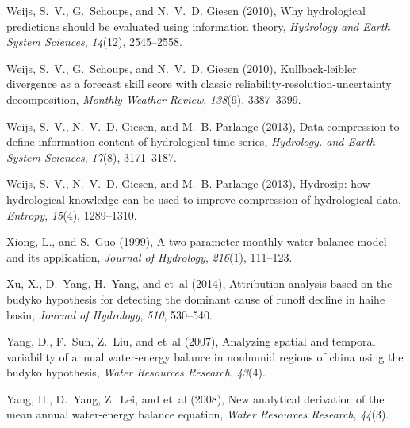 \documentclass[draft,wrr]{AGUTeX}
\begin{document}
\begin{article}
\begin{thebibliography}{59}
Weijs, S.~V., G.~Schoups, and N.~V.~D. Giesen (2010{}), Why
  hydrological predictions should be evaluated using information theory,
  \textit{Hydrology and Earth System Sciences}, \textit{14}(12), 2545--2558.

Weijs, S.~V., G.~Schoups, and N.~V.~D. Giesen (2010{}),
  Kullback-leibler divergence as a forecast skill score with classic
  reliability-resolution-uncertainty decomposition, \textit{Monthly Weather
  Review}, \textit{138}(9), 3387--3399.

Weijs, S.~V., N.~V.~D. Giesen, and M.~B. Parlange (2013{}), Data
  compression to define information content of hydrological time series,
  \textit{Hydrology. and Earth System Sciences}, \textit{17}(8), 3171--3187.

Weijs, S.~V., N.~V.~D. Giesen, and M.~B. Parlange (2013{}),
  Hydrozip: how hydrological knowledge can be used to improve compression of
  hydrological data, \textit{Entropy}, \textit{15}(4), 1289--1310.

Xiong, L., and S.~Guo (1999), A two-parameter monthly water balance model and
  its application, \textit{Journal of Hydrology}, \textit{216}(1), 111--123.

Xu, X., D.~Yang, H.~Yang, and et~al (2014), Attribution analysis based on the
  budyko hypothesis for detecting the dominant cause of runoff decline in haihe
  basin, \textit{Journal of Hydrology}, \textit{510}, 530--540.

Yang, D., F.~Sun, Z.~Liu, and et~al (2007), Analyzing spatial and temporal
  variability of annual water-energy balance in nonhumid regions of china using
  the budyko hypothesis, \textit{Water Resources Research}, \textit{43}(4).

Yang, H., D.~Yang, Z.~Lei, and et~al (2008), New analytical derivation of the
  mean annual water-energy balance equation, \textit{Water Resources Research},
  \textit{44}(3).


\end{thebibliography}
\end{article}
\end{document}

